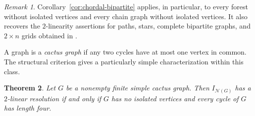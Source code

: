 \documentclass[11pt]{amsart}
\newtheorem{theorem}{Theorem}[section]
\theoremstyle{definition}
\theoremstyle{remark}
\newtheorem{remark}[theorem]{Remark}
\numberwithin{equation}{section}
\newcommand{\NN}{\mathcal N}
\begin{document}
	\begin{remark}
		Corollary~\ref{cor:chordal-bipartite} applies, in particular, to every
		forest without isolated vertices and every chain graph without isolated
		vertices. It also recovers the \(2\)-linearity assertions for paths,
		stars, complete bipartite graphs, and \(2\times n\) grids obtained in
		\cite[Theorems~3.2, 3.4, 3.8, and 3.12]{Froberg2026}.
	\end{remark}
	

	A graph is a \emph{cactus graph} if any two cycles have at most one vertex in
	common. The structural criterion gives a particularly simple characterization
	within this class.

	\begin{theorem}\label{thm:cactus-characterization}
		Let \(G\) be a nonempty finite simple cactus graph. Then
		\(I_{\NN(G)}\) has a \(2\)-linear resolution if and only if \(G\) has no
		isolated vertices and every cycle of \(G\) has length four.
	\end{theorem}
\end{document}
